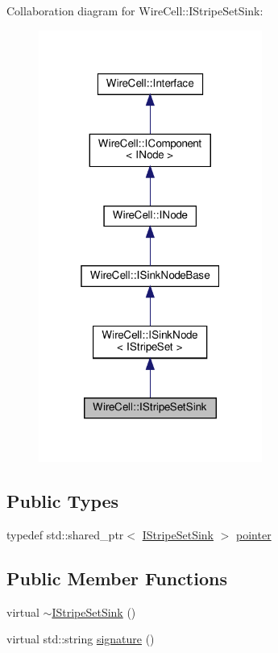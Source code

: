 Collaboration diagram for Wire\+Cell\+:\+:I\+Stripe\+Set\+Sink\+:
\nopagebreak
\begin{figure}[H]
\begin{center}
\leavevmode
\includegraphics[width=208pt]{class_wire_cell_1_1_i_stripe_set_sink__coll__graph}
\end{center}
\end{figure}
\subsection*{Public Types}
\begin{DoxyCompactItemize}
\item 
typedef std\+::shared\+\_\+ptr$<$ \hyperlink{class_wire_cell_1_1_i_stripe_set_sink}{I\+Stripe\+Set\+Sink} $>$ \hyperlink{class_wire_cell_1_1_i_stripe_set_sink_a386ab288b8561c7ef13c4d785c3e9e6c}{pointer}
\end{DoxyCompactItemize}
\subsection*{Public Member Functions}
\begin{DoxyCompactItemize}
\item 
virtual \hyperlink{class_wire_cell_1_1_i_stripe_set_sink_a30dcc873885cc088b48d9f34a57daad7}{$\sim$\+I\+Stripe\+Set\+Sink} ()
\item 
virtual std\+::string \hyperlink{class_wire_cell_1_1_i_stripe_set_sink_aaa2c3a55c8466713a949936d192433a6}{signature} ()
\end{DoxyCompactItemize}


